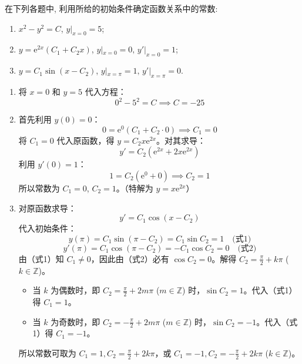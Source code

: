 \documentclass[lang=cn,11pt]{elegantbook}
\begin{document}
\begin{exercise}[求参数]
在下列各题中, 利用所给的初始条件确定函数关系中的常数:
\begin{enumerate}
    \item[(1)] $\displaystyle x^2-y^2=C$, $\displaystyle y|_{x=0}=5$;
    \item[(2)] $\displaystyle y=\mathrm{e}^{2x}(C_1+C_2x)$, $\displaystyle y|_{x=0}=0,\,y'|_{x=0}=1$;
    \item[(3)] $\displaystyle y=C_1\sin(x-C_2)$, $\displaystyle y|_{x=\pi}=1,\,y'|_{x=\pi}=0$.
\end{enumerate}
\end{exercise}
\begin{solution}
\begin{enumerate}
    \item[(1)] 将 $x=0$ 和 $y=5$ 代入方程：
    $$0^2 - 5^2 = C \implies C = -25$$
    \item[(2)] 首先利用 $y(0)=0$：
    $$0 = \mathrm{e}^0(C_1 + C_2 \cdot 0) \implies C_1 = 0$$
    将 $C_1=0$ 代入原函数，得 $y = C_2 x \mathrm{e}^{2x}$。对其求导：
    $$y' = C_2(\mathrm{e}^{2x} + 2x\mathrm{e}^{2x})$$
    利用 $y'(0)=1$：
    $$1 = C_2(\mathrm{e}^0 + 0) \implies C_2 = 1$$
    所以常数为 $C_1 = 0$, $C_2 = 1$。（特解为 $y=x\mathrm{e}^{2x}$）
    \item[(3)] 对原函数求导：
    $$y' = C_1\cos(x-C_2)$$
    代入初始条件：
    $$y(\pi) = C_1\sin(\pi-C_2) = C_1\sin C_2 = 1 \quad \text{(式1)}$$
    $$y'(\pi) = C_1\cos(\pi-C_2) = -C_1\cos C_2 = 0 \quad \text{(式2)}$$
    由（式1）知 $C_1 \neq 0$，因此由（式2）必有 $\cos C_2 = 0$。解得 $C_2 = \frac{\pi}{2} + k\pi$ ($k \in \mathbb{Z}$)。
    \begin{itemize}
        \item 当 $k$ 为偶数时，即 $C_2 = \frac{\pi}{2} + 2m\pi$ ($m \in \mathbb{Z}$) 时，$\sin C_2 = 1$。代入（式1）得 $C_1 = 1$。
        \item 当 $k$ 为奇数时，即 $C_2 = -\frac{\pi}{2} + 2m\pi$ ($m \in \mathbb{Z}$) 时，$\sin C_2 = -1$。代入（式1）得 $C_1 = -1$。
    \end{itemize}
    所以常数可取为 $C_1=1, C_2=\frac{\pi}{2}+2k\pi$，或 $C_1=-1, C_2=-\frac{\pi}{2}+2k\pi$ ($k \in \mathbb{Z}$)。
\end{enumerate}
\end{solution}
\end{document}

